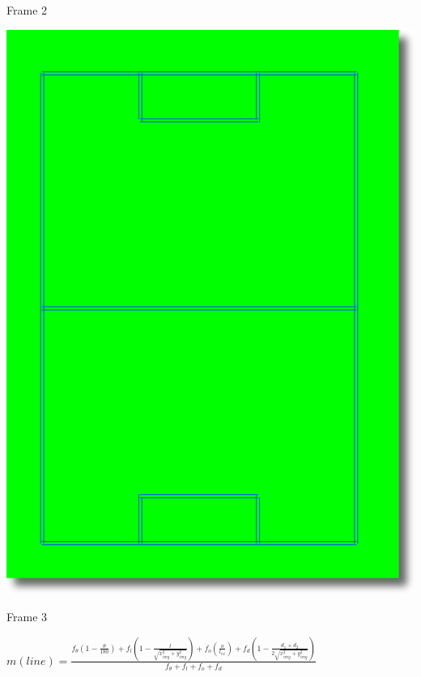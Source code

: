 \documentclass[ucs,9pt]{beamer}
\begin{document}
\begin{frame}{Frame 2}
\begin{center}
		\includegraphics[width=\textwidth,height=0.8\textheight,keepaspectratio]{img/model1-shadow}
	\end{center}
\end{frame}

\begin{frame}{Frame 3}
  \begin{center}
    $m(line)=\frac{f_{\theta}\left(1-\frac{\theta}{180}\right)+f_{l}\left(1-\frac{l}{\sqrt{x_{img}^{2}+y_{img}^{2}}}\right)+f_{o}\left(\frac{o}{l_{ex}}\right)+f_{d}\left(1-\frac{d_{1}+d_{2}}{2\sqrt{x_{img}^{2}+y_{img}^{2}}}\right)}{f_{\theta}+f_{l}+f_{o}+f_{d}}$
  \end{center}
\end{frame}
\end{document}

